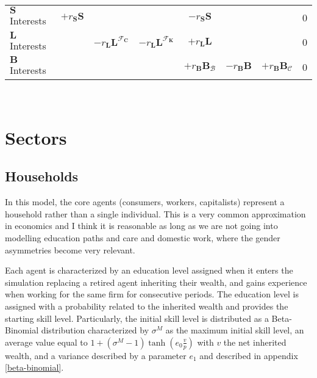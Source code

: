 \documentclass[a4paper, headings=standardclasses]{scrartcl}
\begin{document}
{\begin{tabularx}{\textwidth}{@{} Y|cccccc|l @{}}
		\midrule
		$\mathbf{S}$ Interests & $+r_{\mathbf{S}} \mathbf{S}$             &                                                         &                                                                        & $-r_{\mathbf{S}} \mathbf{S}$           &                                          &                                        & 0    \\
		$\mathbf{L}$ Interests &                                          & $-r_{\mathbf{L}} \mathbf{L}^{\mathcal{F}_{\mathbf{C}}}$ & $-r_{\mathbf{L}} \mathbf{L}^{\mathcal{F}_{\mathbf{K}}}$                & $+r_{\mathbf{L}} \mathbf{L}$           &                                          &                                        & 0    \\
		$\mathbf{B}$ Interests &                                          &                                                         &                                                                        & $+r_\mathbf{B} \mathbf{B}_\mathcal{B}$ & $-r_\mathbf{B} \mathbf{B}$               & $+r_\mathbf{B} \mathbf{B}_\mathcal{C}$ & 0    \\
		\bottomrule
	\end{tabularx}
}\\

\section{Sectors}
\subsection{Households}
In this model, the core agents (consumers, workers, capitalists) represent a household rather than a single individual. This is a very common approximation in economics and I think it is reasonable as long as we are not going into modelling education paths and care and domestic work, where the gender asymmetries become very relevant.

Each agent is characterized by an education level assigned when it enters the simulation replacing a retired agent inheriting their wealth, and gains experience when working for the same firm for consecutive periods.
The education level is assigned with a probability related to the inherited wealth and provides the starting skill level.
Particularly, the initial skill level is distributed as a Beta-Binomial distribution characterized by $\sigma^M$ as the maximum initial skill level, an average value equal to $1+(\sigma^M-1)\tanh(e_0 \frac{v}{p})$ with $v$ the net inherited wealth, and a variance described by a parameter $e_1$ and described in appendix \ref{beta-binomial}.
\end{document}
